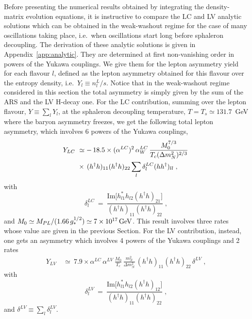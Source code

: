 \documentclass[prd,twocolumn,superscriptaddress,preprintnumbers,nofootinbib,
noshowpacs,groupedaddress]{revtex4-1} %
\begin{document}
Before presenting the numerical results obtained by integrating the density-matrix evolution equations, it is instructive to compare the LC and LV analytic solutions which can be obtained in the weak-washout regime for the case of many oscillations taking place, i.e.~when oscillations start long before sphaleron decoupling.
The derivation of these analytic solutions is given in Appendix~\ref{app:analytic}. They are determined at first non-vanishing order in powers of the Yukawa couplings. We give them for the lepton asymmetry yield for each flavour $l$, defined as the lepton asymmetry obtained for this flavour over the entropy density, i.e.~$Y_l\equiv n_l^L/s$. Notice that in the weak-washout regime considered in this section the total asymmetry is simply given by the sum of the ARS and the LV H-decay one.
For
the LC contribution, summing over the lepton flavour, $Y \equiv \sum_l Y_l$, at the sphaleron decoupling temperature, $T=T_s\simeq 131.7$~GeV where the baryon asymmetry freezes, we get the following total lepton asymmetry, which involves 6 powers of the Yukawa couplings,
\begin{align}
Y_{LC} \ &\simeq  - \, 18.5 \times (\alpha^{LC})^2 \, \alpha^{LC}_W \, \frac{M_0^{7/3}}{T_c (\Delta m^2_N)^{2/3}} \,\notag\\
&\times \, (h^\dag h)_{11} (h^\dag h)_{22} \sum_l \delta_l^{LC} (h h^\dag)_{ll} \;,
\label{LFanalytsol}
\end{align}
with  
\begin{equation}
\delta^{LC}_l \ = \ \frac{\mathrm{Im}\big[h_{l1}^* h_{l2} (h^\dag h)_{21}\big]}{(h^\dag h)_{11} (h^\dag h)_{22}} \;,
\end{equation}
and $M_0 \simeq M_{PL}/(1.66 \, g_*^{1/2}) \simeq \unit[7 \times 10^{17}]{GeV}$. This result involves three rates whose value are given in the previous Section.
For the LV contribution, instead, one gets an asymmetry which involves 4 powers of the Yukawa couplings and 2 rates
\begin{align}
Y_{LV} \ &\simeq \ 7.9 \times \alpha^{LC} \, \alpha^{LV} \, \frac{M_0}{T_c} \,\frac{m_N^2}{\Delta m_N^2} \, (h^\dag h)_{11} (h^\dag h)_{22} \, \delta^{LV} \;,
\label{LVanalytsol}
\end{align}
with  
\begin{equation}
\delta^{LV}_l \ = \ \frac{\mathrm{Im}\big[h_{l1}^* h_{l2} (h^\dag h)_{12}\big]}{(h^\dag h)_{11} (h^\dag h)_{22}}\;,
\end{equation}
and $\delta^{LV} \equiv \sum_l \delta^{LV}_l$.
\end{document}
